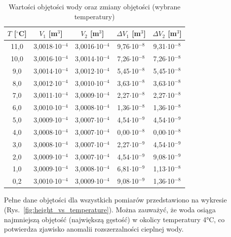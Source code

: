 \documentclass[a4paper,12pt]{article}
\begin{document}
\begin{table}[H]
    \centering
    \caption{Wartości objętości wody oraz zmiany objętości (wybrane temperatury)}
    \label{tab:objetosci}
    \begin{tabular}{|c|c|c|c|c|}
        \hline
        $T$ [$^\circ$C] & $V_1$ [m$^3$] & $V_2$ [m$^3$] & $\Delta V_1$ [m$^3$] & $\Delta V_2$ [m$^3$] \\
        \hline
        11{,}0 & 3{,}0018$\cdot$10$^{-4}$ & 3{,}0016$\cdot$10$^{-4}$ & 9{,}76$\cdot$10$^{-8}$ & 9{,}31$\cdot$10$^{-8}$ \\
        10{,}0 & 3{,}0016$\cdot$10$^{-4}$ & 3{,}0014$\cdot$10$^{-4}$ & 7{,}26$\cdot$10$^{-8}$ & 7{,}26$\cdot$10$^{-8}$ \\
        9{,}0 & 3{,}0014$\cdot$10$^{-4}$ & 3{,}0012$\cdot$10$^{-4}$ & 5{,}45$\cdot$10$^{-8}$ & 5{,}45$\cdot$10$^{-8}$ \\
        8{,}0 & 3{,}0012$\cdot$10$^{-4}$ & 3{,}0010$\cdot$10$^{-4}$ & 3{,}63$\cdot$10$^{-8}$ & 3{,}63$\cdot$10$^{-8}$ \\
        7{,}0 & 3{,}0011$\cdot$10$^{-4}$ & 3{,}0009$\cdot$10$^{-4}$ & 2{,}27$\cdot$10$^{-8}$ & 2{,}27$\cdot$10$^{-8}$ \\
        6{,}0 & 3{,}0010$\cdot$10$^{-4}$ & 3{,}0008$\cdot$10$^{-4}$ & 1{,}36$\cdot$10$^{-8}$ & 1{,}36$\cdot$10$^{-8}$ \\
        5{,}0 & 3{,}0009$\cdot$10$^{-4}$ & 3{,}0007$\cdot$10$^{-4}$ & 4{,}54$\cdot$10$^{-9}$ & 4{,}54$\cdot$10$^{-9}$ \\
        4{,}0 & 3{,}0008$\cdot$10$^{-4}$ & 3{,}0007$\cdot$10$^{-4}$ & 0{,}00$\cdot$10$^{-8}$ & 0{,}00$\cdot$10$^{-8}$ \\
        3{,}0 & 3{,}0008$\cdot$10$^{-4}$ & 3{,}0007$\cdot$10$^{-4}$ & 2{,}27$\cdot$10$^{-9}$ & 4{,}54$\cdot$10$^{-9}$ \\
        2{,}0 & 3{,}0009$\cdot$10$^{-4}$ & 3{,}0007$\cdot$10$^{-4}$ & 4{,}54$\cdot$10$^{-9}$ & 9{,}08$\cdot$10$^{-9}$ \\
        1{,}0 & 3{,}0009$\cdot$10$^{-4}$ & 3{,}0008$\cdot$10$^{-4}$ & 6{,}81$\cdot$10$^{-9}$ & 1{,}13$\cdot$10$^{-8}$ \\
        0{,}2 & 3{,}0010$\cdot$10$^{-4}$ & 3{,}0009$\cdot$10$^{-4}$ & 9{,}08$\cdot$10$^{-9}$ & 1{,}36$\cdot$10$^{-8}$ \\
        \hline
    \end{tabular}
\end{table}

Pełne dane objętości dla wszystkich pomiarów przedstawiono na wykresie (Rys.~\ref{fig:height_vs_temperature}). Można zauważyć, że woda osiąga najmniejszą objętość (największą gęstość) w okolicy temperatury 4°C, co potwierdza zjawisko anomalii rozszerzalności cieplnej wody.
\end{document}
